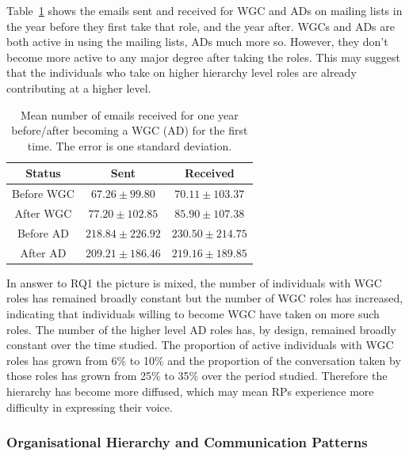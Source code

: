 \documentclass[twocolumn,10pt]{article}
\newcommand{\pb}[1]{\vspace{0.75ex}\noindent{\textbf{#1}}}
\begin{document}
Table~\ref{tab:WGC_email} shows the emails sent and received for WGC and
ADs on mailing lists in the year before they first take that role, and the
year after. WGCs and ADs are both active in using the mailing lists, ADs
much more so. However, they don't become more active to any major degree
after taking the roles. This may suggest that the individuals who take on
higher hierarchy level roles are already contributing at a higher level.

\begin{table}[!tbp]
\centering
    \begin{tabular}{c||c|c}
        Status & Sent & Received \\
         \hline \hline 
        Before WGC & $67.26\pm99.80$ & $70.11\pm103.37$ \\
        \hline
        After WGC & $77.20\pm102.85$ & $85.90\pm107.38$ \\
        \hline
        Before AD & $218.84\pm226.92$ & $230.50\pm214.75$ \\
        \hline
        After AD & $209.21\pm186.46$ & $219.16\pm189.85$ \\
    \end{tabular}
        \caption{Mean number of emails received for one year before/after becoming a WGC (AD) for the first time. The error is one standard deviation.}
    \label{tab:WGC_email}
\end{table}

\pb{Summary}
In answer to RQ1 the picture is mixed, the number of individuals with WGC
roles has remained broadly constant but the number of WGC roles has
increased, indicating that individuals willing to become WGC have taken on
more such roles. The number of the higher level AD roles has, by design,
remained broadly constant over the time studied. The proportion of active
individuals with WGC roles has grown from 6\% to 10\% and the proportion of
the conversation taken by those roles has grown from 25\% to 35\% over the
period studied. Therefore the hierarchy has become more diffused, which may
mean RPs experience more difficulty in expressing their voice.


\subsubsection{Organisational Hierarchy and Communication Patterns}
\label{sec:org-dynamics:hierarchy:rq2}
\end{document}
